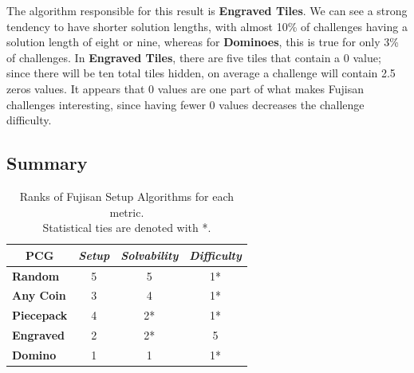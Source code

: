 \documentclass[10pt,journal,compsoc]{IEEEtran}
\begin{document}
The algorithm responsible for this result is {\bf Engraved Tiles}. We can see a strong tendency to have shorter solution lengths, with almost 10\% of challenges having a solution length of eight or nine, whereas for {\bf Dominoes}, this is true for only 3\% of challenges. In {\bf Engraved Tiles}, there are five tiles that contain a 0 value; since there will be ten total tiles hidden, on average a challenge will contain 2.5 zeros values. It appears that 0 values are one part of what makes Fujisan challenges interesting, since having fewer 0 values decreases the challenge difficulty.


\subsection{Summary}
\begin{table}[]
\centering
\renewcommand{\arraystretch}{1.3}
\caption{Ranks of Fujisan Setup Algorithms for each metric.\\ Statistical ties are denoted with *.}
\label{table_example}
\begin{tabular}{l|c|c|c|}
\multicolumn{1}{c|}{\textbf{PCG}} & \multicolumn{1}{l|}{\textit{\textbf{Setup}}} & \multicolumn{1}{l|}{\textit{\textbf{Solvability}}} & \multicolumn{1}{l|}{\textit{\textbf{Difficulty}}} \\ \hline
\textbf{Random}                   & 5                                            & 5                                                  & 1*                                                 \\ \hline
\textbf{Any Coin}                 & 3                                            & 4                                                  & 1*                                                 \\ \hline
\textbf{Piecepack}                & 4                                            & 2*                                                  & 1*                                                 \\ \hline
\textbf{Engraved}                 & 2                                            & 2*                                                  & 5                                                 \\ \hline
\textbf{Domino}                   & 1                                            & 1                                                  & 1*                                                 \\ \hline
\end{tabular}
\end{table}
\end{document}
